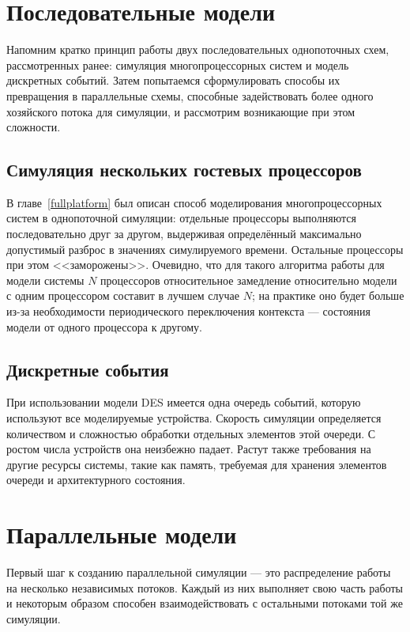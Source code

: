 \section{Последовательные модели}

Напомним кратко принцип работы двух последовательных однопоточных схем, рассмотренных ранее: симуляция многопроцессорных систем и модель дискретных событий. Затем попытаемся сформулировать способы их превращения в параллельные схемы, способные задействовать более одного хозяйского потока для симуляции, и рассмотрим возникающие при этом сложности.

\subsection{Симуляция нескольких гостевых процессоров}

В главе~\ref{fullplatform} был описан способ моделирования многопроцессорных систем в однопоточной симуляции: отдельные процессоры выполняются последовательно друг за другом, выдерживая определённый максимально допустимый разброс в значениях симулируемого времени. Остальные процессоры при этом <<заморожены>>. Очевидно, что для такого алгоритма работы для модели системы $N$ процессоров относительное замедление относительно модели с одним процессором составит в лучшем случае $N$; на практике оно будет больше из-за необходимости периодического переключения контекста — состояния модели от одного процессора к другому.

\subsection{Дискретные события}

При использовании модели DES имеется одна очередь событий, которую используют все моделируемые устройства. Скорость симуляции определяется количеством и сложностью обработки отдельных элементов этой очереди. С ростом числа устройств она неизбежно падает. Растут также требования на другие ресурсы системы, такие как память, требуемая для хранения элементов очереди и архитектурного состояния.

\section{Параллельные модели}

Первый шаг к созданию параллельной симуляции — это распределение работы на несколько независимых потоков. Каждый из них выполняет свою часть работы и некоторым образом способен взаимодействовать с остальными потоками той же симуляции. 

